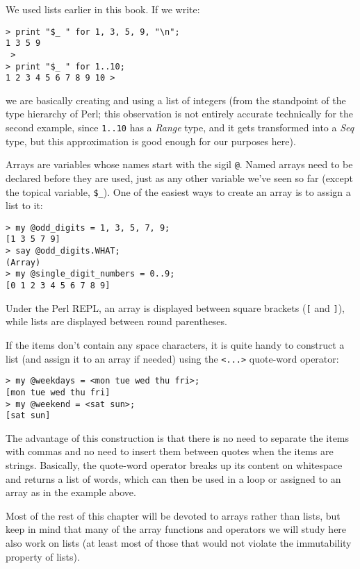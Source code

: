 We used lists earlier in this book. If we write:

\begin{verbatim}
> print "$_ " for 1, 3, 5, 9, "\n";
1 3 5 9
 >
> print "$_ " for 1..10;
1 2 3 4 5 6 7 8 9 10 >
\end{verbatim}

we are basically creating and using a list of integers (from 
the standpoint of the type hierarchy of Perl; this observation is 
not entirely accurate technically for the second example, since 
\verb'1..10' has a \emph{Range} type, and it gets 
transformed into a \emph{Seq} type, but this approximation is 
good enough for our purposes here).

Arrays are variables whose names start with the sigil \verb'@'.
Named arrays  need to be declared before they are used, just 
as any other variable we've seen so far (except the topical 
variable, \verb'$_'). One of the easiest 
ways to create an array is to assign a list to it:

\begin{verbatim}
> my @odd_digits = 1, 3, 5, 7, 9;
[1 3 5 7 9]
> say @odd_digits.WHAT;
(Array)
> my @single_digit_numbers = 0..9;
[0 1 2 3 4 5 6 7 8 9]
\end{verbatim}

Under the Perl REPL, an array is displayed between square 
brackets (\verb"[" and \verb"]"), while lists are displayed 
between round parentheses.

If the items don't contain any space characters, it is quite handy 
to construct a list (and assign it to an array if needed) using 
the \verb'<...>' quote-word operator:

\begin{verbatim}
> my @weekdays = <mon tue wed thu fri>;
[mon tue wed thu fri]
> my @weekend = <sat sun>;
[sat sun]
\end{verbatim}

The advantage of this construction is that there is no need to 
separate the items with commas and no need to insert them between 
quotes when the items are strings. Basically, 
the quote-word operator breaks up its content on whitespace 
and returns a list of words, which can then be 
used in a loop or assigned to an array as in the example 
above.

Most of the rest of this chapter will be devoted to arrays 
rather than lists, but keep in mind that many of the array 
functions and operators we will study here also work on lists 
(at least most of those that would not violate the 
immutability property of lists).
 
